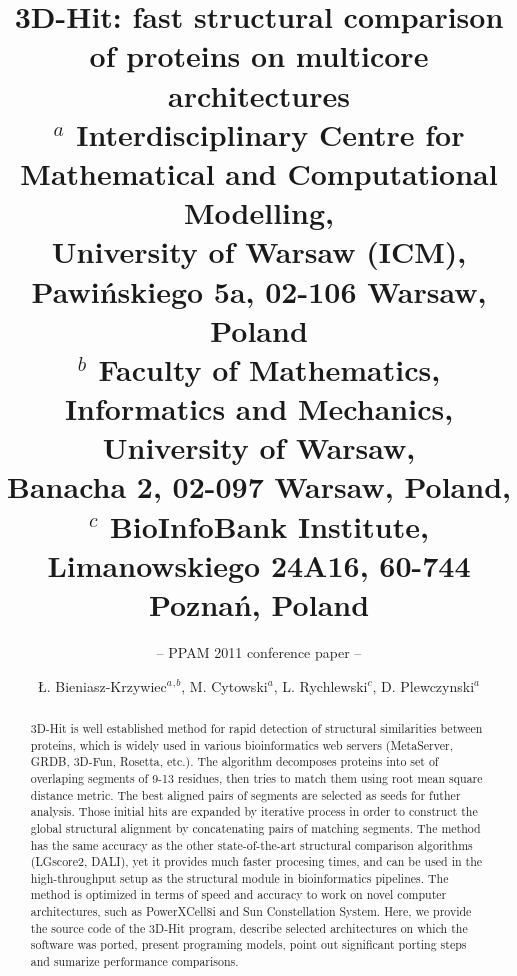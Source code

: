 \documentclass[envcountsame,envcountchap]{svmono}
\begin{document}
\author{\L{}. Bieniasz-Krzywiec$^a$$^,$$^b$, M. Cytowski$^a$, L. Rychlewski$^c$, D. Plewczynski$^a$}
\title{3D-Hit: fast structural comparison of proteins on multicore architectures\\
{\small $^a$ Interdisciplinary Centre for Mathematical and Computational Modelling, \\
University of Warsaw (ICM), 
Pawi\'nskiego 5a, 02-106 Warsaw, Poland \\
$^b$ Faculty of Mathematics, Informatics and Mechanics, University of Warsaw,\\ Banacha 2, 02-097 Warsaw, Poland, \\
$^c$ BioInfoBank Institute,\\ Limanowskiego 24A16, 60-744 Pozna\'n, Poland }}


\subtitle{-- PPAM 2011 conference paper --}



\begin{abstract}

3D-Hit is well established method for rapid detection of structural similarities between proteins, which 
is widely used in various bioinformatics web servers
(MetaServer, GRDB, 3D-Fun, Rosetta, etc.). 
The algorithm decomposes proteins into set of overlaping segments of 9-13 residues, then tries to
match them using root mean square distance metric. The best aligned pairs of segments are selected as seeds for futher analysis. 
Those initial hits are expanded by iterative process in order to construct the global structural alignment by 
concatenating pairs of matching segments.
The method has the same accuracy as the other state-of-the-art structural comparison algorithms (LGscore2, DALI), yet it provides
much faster procesing times, and can be used in the high-throughput setup as the structural module in bioinformatics pipelines. 
The method is optimized in terms of speed and accuracy to work on  novel computer architectures, such as PowerXCell8i and Sun Constellation System. Here, we provide the source code of the 3D-Hit program, describe selected architectures on which the software was ported, 
present programing models, point out significant porting steps
and sumarize performance comparisons.

\end{abstract}
\end{document}
